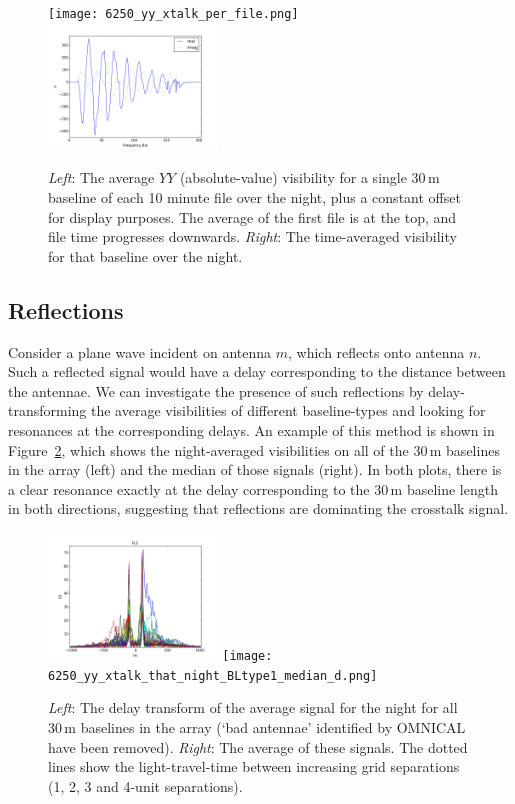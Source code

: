 \documentclass[10pt,a4paper,notitlepage]{article}
\begin{document}
\begin{figure}
\centering
\texttt{[image: 6250\_yy\_xtalk\_per\_file.png]}
\includegraphics[width=0.4\textwidth]{mean_xtalk_all_1unit_BLs_6250.png}
\caption{\textit{Left}: The average $YY$ (absolute-value) visibility for a single 30\,m baseline of each 10 minute file over the night, plus a constant offset for display purposes. The average of the first file is at the top, and file time progresses downwards. \textit{Right}: The time-averaged visibility for that baseline over the night.}
\label{fig:xtalk-per-file}
\end{figure}

\subsection{Reflections}
Consider a plane wave incident on antenna $m$, which reflects onto antenna $n$. Such a reflected signal would have a delay corresponding to the distance between the antennae. We can investigate the presence of such reflections by delay-transforming the average visibilities of different baseline-types and looking for resonances at the corresponding delays. An example of this method is shown in Figure~\ref{fig:xtalk-for-BL1}, which shows the night-averaged visibilities on all of the 30\,m baselines in the array (left) and the median of those signals (right). In both plots, there is a clear resonance exactly at the delay corresponding to the 30\,m baseline length in both directions, suggesting that reflections are dominating the crosstalk signal.\\

\begin{figure}
\centering
\includegraphics[width=0.4\textwidth]{6250_yy_xtalk_that_night_BLtype1_d.png}
\texttt{[image: 6250\_yy\_xtalk\_that\_night\_BLtype1\_median\_d.png]}
\caption{\textit{Left}: The delay transform of the average signal for the night for all 30\,m baselines in the array (`bad antennae' identified by OMNICAL have been removed). \textit{Right}: The average of these signals. The dotted lines show the light-travel-time between increasing grid separations (1, 2, 3 and 4-unit separations).}
\label{fig:xtalk-for-BL1}
\end{figure}
\end{document}
